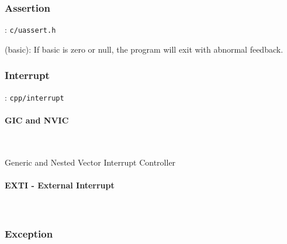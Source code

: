 \subsubsection{Assertion}
: \verb`c/uassert.h`

(basic): If basic is zero or null, the program will exit with abnormal feedback.

\subsubsection{Interrupt}
: \verb`cpp/interrupt`


\paragraph{GIC and NVIC} \

Generic and Nested Vector Interrupt Controller

\paragraph{EXTI - External Interrupt} \


\subsubsection{Exception}


